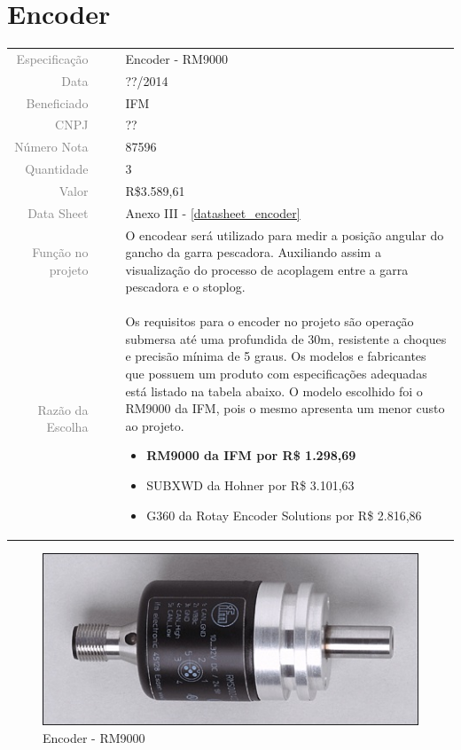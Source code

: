 

\section{Encoder}
\label{encoder}


\begin{table}[ht!]

	\begin{tabular}{r l|l p{12cm} }
		
		\textcolor{gray}{Especificação} &&& 	{Encoder - RM9000 }\\
		\textcolor{gray}{Data} &&& 				{??/2014}\\
        \textcolor{gray}{Beneficiado} &&&		{IFM} \\
        \textcolor{gray}{CNPJ} &&& 				{??} \\
        \textcolor{gray}{Número Nota} &&& 		{87596} \\
		\textcolor{gray}{Quantidade} &&& 		{3} \\
		\textcolor{gray}{Valor} &&& 			{R\$3.589,61} \\
		\textcolor{gray}{Data Sheet} &&& 		{Anexo III - \ref{datasheet_encoder} } \\

		\textcolor{gray}{Função no projeto} &&& {O encodear será utilizado para medir a posição angular do gancho da garra pescadora. Auxiliando assim a visualização do processo de acoplagem entre a garra pescadora e o stoplog.   } \\
		\textcolor{gray}{Razão da Escolha} &&& {Os requisitos para o encoder no projeto são operação submersa até uma profundida de 30m, resistente a choques e precisão mínima de 5 graus.  Os modelos e fabricantes que possuem um produto com especificações adequadas está listado na tabela abaixo. O modelo escolhido foi o RM9000 da IFM, pois o mesmo apresenta um menor custo ao projeto. 
		\begin{itemize}
		  \item \textbf{RM9000 da IFM por R\$ 1.298,69} 
		  \item SUBXWD da Hohner por R\$ 3.101,63
		  \item G360 da Rotay Encoder Solutions por R\$ 2.816,86
		\end{itemize}}
		

	\end{tabular}
\end{table}

\begin{figure}[h!]
 \centering
 \includegraphics[width=0.3\columnwidth]{Encoder/foto}
 \caption{Encoder - RM9000 }
  
\end{figure}
\newpage

